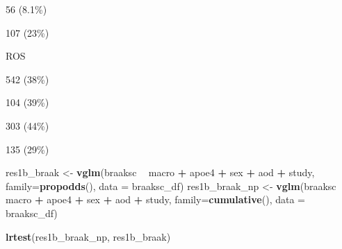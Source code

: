 \documentclass[]{book}
\newenvironment{Shaded}{\begin{snugshade}}{\end{snugshade}}
\newcommand{\DataTypeTok}[1]{\textcolor[rgb]{0.13,0.29,0.53}{#1}}
\newcommand{\KeywordTok}[1]{\textcolor[rgb]{0.13,0.29,0.53}{\textbf{#1}}}
\newcommand{\NormalTok}[1]{#1}
\newcommand{\OperatorTok}[1]{\textcolor[rgb]{0.81,0.36,0.00}{\textbf{#1}}}
\newcommand{\StringTok}[1]{\textcolor[rgb]{0.31,0.60,0.02}{#1}}
\begin{document}
56 (8.1\%)

107 (23\%)

ROS

542 (38\%)

104 (39\%)

303 (44\%)

135 (29\%)

\begin{Shaded}
\end{Shaded}

\begin{Shaded}
\begin{Highlighting}[]
\NormalTok{res1b_braak <-}\StringTok{ }\KeywordTok{vglm}\NormalTok{(braaksc }\OperatorTok{~}\StringTok{ }\NormalTok{macro }\OperatorTok{+}\StringTok{ }\NormalTok{apoe4 }\OperatorTok{+}\StringTok{ }\NormalTok{sex }\OperatorTok{+}\StringTok{ }\NormalTok{aod }\OperatorTok{+}\StringTok{ }\NormalTok{study, }
                  \DataTypeTok{family=}\KeywordTok{propodds}\NormalTok{(), }\DataTypeTok{data =}\NormalTok{ braaksc_df)}
\NormalTok{res1b_braak_np <-}\StringTok{ }\KeywordTok{vglm}\NormalTok{(braaksc }\OperatorTok{~}\StringTok{ }\NormalTok{macro }\OperatorTok{+}\StringTok{ }\NormalTok{apoe4 }\OperatorTok{+}\StringTok{ }\NormalTok{sex }\OperatorTok{+}\StringTok{ }\NormalTok{aod }\OperatorTok{+}\StringTok{ }\NormalTok{study, }
                     \DataTypeTok{family=}\KeywordTok{cumulative}\NormalTok{(), }\DataTypeTok{data =}\NormalTok{ braaksc_df)}

\KeywordTok{lrtest}\NormalTok{(res1b_braak_np, res1b_braak)}
\end{Highlighting}
\end{Shaded}
\end{document}
